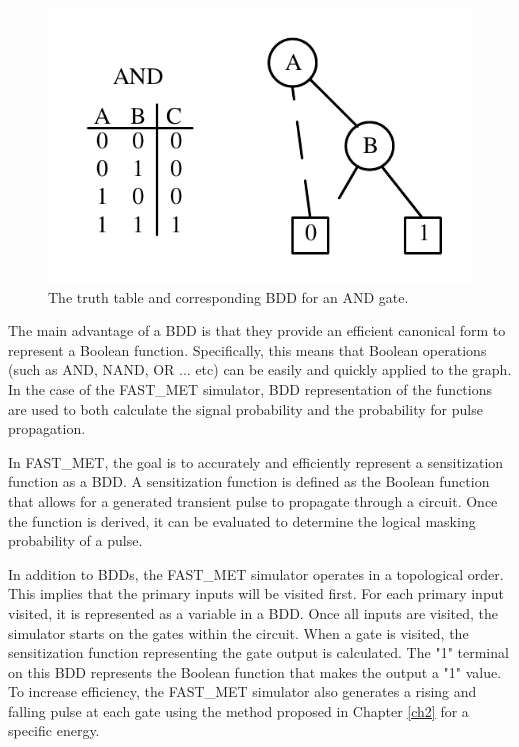 \begin{figure}[!htbp]
	\centering
	\includegraphics[width=0.55\linewidth]{Figures/BDDFunc}
	\caption{The truth table and corresponding BDD for an AND gate.}
	\label{BDD_AND}
\end{figure}

The main advantage of a BDD is that they provide an efficient canonical form to represent a Boolean function. Specifically, this means that Boolean operations (such as AND, NAND, OR ... etc) can be easily and quickly applied to the graph. In the case of the FAST\_MET simulator, BDD representation of the functions are used to both calculate the signal probability and the probability for pulse propagation.

In FAST\_MET, the goal is to accurately and efficiently represent a sensitization function as a BDD. A sensitization function is defined as the Boolean function that allows for a generated transient pulse to propagate through a circuit. Once the function is derived, it can be evaluated to determine the logical masking probability of a pulse.

In addition to BDDs, the FAST\_MET simulator operates in a topological order. This implies that the primary inputs will be visited first. For each primary input visited, it is represented as a variable in a BDD. Once all inputs are visited, the simulator starts on the gates within the circuit. When a gate is visited, the sensitization function representing the gate output is calculated. The "1" terminal on this BDD represents the Boolean function that makes the output a "1" value. To increase efficiency, the FAST\_MET simulator also generates a rising and falling pulse at each gate using the method proposed in Chapter \ref{ch2} for a specific energy.

